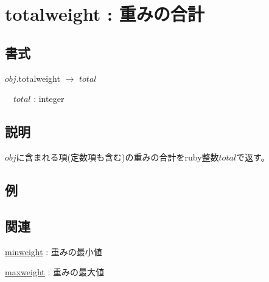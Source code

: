 
\section{totalweight : 重みの合計\label{sect:totalweight}}
\subsection*{書式}
$obj$.totalweight $\rightarrow$ $total$

~~$total$ : integer

\subsection*{説明}
$obj$に含まれる項(定数項も含む)の重みの合計をruby整数$total$で返す。

\subsection*{例}


\subsection*{関連}
\hyperref[sect:minweight]{minweight} : 重みの最小値

\hyperref[sect:maxweight]{maxweight} : 重みの最大値
